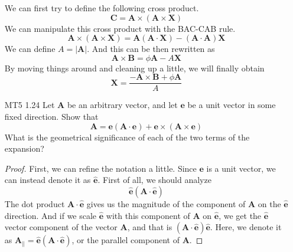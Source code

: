 \documentclass[12pt]{article}
\newcommand{\paren}[1]{\left( #1 \right)}
\newcommand{\abso}[1]{\left|#1 \right|}
\begin{document}
\begin{enumerate}
        We can first try to define the following cross product.
        \[
        \mathbf{C} = \mathbf{A}\times\paren{\mathbf{A}\times \mathbf{X}}
        \]
        We can manipulate this cross product with the BAC-CAB rule.
        \[
        \mathbf{A}\times\paren{\mathbf{A}\times \mathbf{X}} = \mathbf{A}\paren{\mathbf{A}\cdot\mathbf{X}} - \paren{\mathbf{A}\cdot\mathbf{A}}\mathbf{X}
        \]
        We can define $A = \abso{\mathbf{A}}$. And this can be then rewritten as
        \[
        \mathbf{A}\times\mathbf{B} = \phi\mathbf{A}- A\mathbf{X}
        \]
        By moving things around and cleaning up a little, we will finally obtain
        \[
        \mathbf{X} = \frac{-\mathbf{A}\times\mathbf{B} + \phi\mathbf{A}}{A}
        \]

        \item[MT5 1.24] Let \(\mathbf{A}\) be an arbitrary vector, and let \(\mathbf{e}\) be a unit vector in some fixed direction. Show that
        \[
        \mathbf{A} = \mathbf{e} (\mathbf{A} \cdot \mathbf{e}) + \mathbf{e} \times (\mathbf{A} \times \mathbf{e})
        \]
        What is the geometrical significance of each of the two terms of the expansion?

        \begin{proof}
            First, we can refine the notation a little. Since $\mathbf{e}$ is a unit vector, we can instead denote it as $\hat{\mathbf{e}}$. First of all, we should analyze
        \[
        \hat{\mathbf{e}}\paren{\mathbf{A}\cdot \hat{\mathbf{e}}}
        \]
        The dot product $\mathbf{A}\cdot \hat{\mathbf{e}}$ gives us the magnitude of the component of $\mathbf{A}$ on the $\hat{\mathbf{e}}$ direction. And if we scale $\hat{\mathbf{e}}$ with this component of $\mathbf{A}$ on $\hat{\mathbf{e}}$, we get the $\hat{\mathbf{e}}$ vector component of the vector $\mathbf{A}$, and that is $\paren{\mathbf{A}\cdot \hat{\mathbf{e}}}\hat{\mathbf{e}}$. Here, we denote it as $\mathbf{A}_\parallel = \hat{\mathbf{e}}\paren{\mathbf{A}\cdot \hat{\mathbf{e}}}$, or the parallel component of $\mathbf{A}$.


\end{proof}
\end{enumerate}
\end{document}
